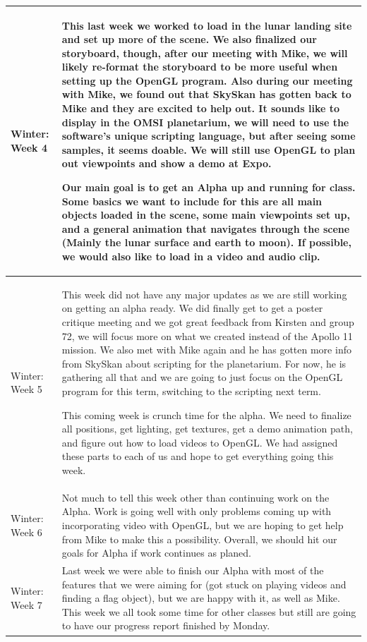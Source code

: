 \documentclass[onecolumn, draftclsnofoot,10pt, compsoc]{IEEEtran}
\begin{document}
\begin{longtable} {|p{1.5cm}|p{13.5cm}|}
Winter: Week 4 &This last week we worked to load in the lunar landing site and set up more of the scene. We also finalized our storyboard, though, after our meeting with Mike, we will likely re-format the storyboard to be more useful when setting up the OpenGL program. Also during our meeting with Mike, we found out that SkySkan has gotten back to Mike and they are excited to help out. It sounds like to display in the OMSI planetarium, we will need to use the software's unique scripting language, but after seeing some samples, it seems doable. We will still use OpenGL to plan out viewpoints and show a demo at Expo. 

Our main goal is to get an Alpha up and running for class. Some basics we want to include for this are all main objects loaded in the scene, some main viewpoints set up, and a general animation that navigates through the scene (Mainly the lunar surface and earth to moon). If possible, we would also like to load in a video and audio clip. 
\\ \hline

Winter: Week 5 & This week did not have any major updates as we are still working on getting an alpha ready. We did finally get to get a poster critique meeting and we got great feedback from Kirsten and group 72, we will focus more on what we created instead of the Apollo 11 mission. We also met with Mike again and he has gotten more info from SkySkan about scripting for the planetarium. For now, he is gathering all that and we are going to just focus on the OpenGL program for this term, switching to the scripting next term. 

This coming week is crunch time for the alpha. We need to finalize all positions, get lighting, get textures, get a demo animation path, and figure out how to load videos to OpenGL. We had assigned these parts to each of us and hope to get everything going this week. 
\\ \hline

Winter: Week 6 & 
Not much to tell this week other than continuing work on the Alpha. Work is going well with only problems coming up with incorporating video with OpenGL, but we are hoping to get help from Mike to make this a possibility. Overall, we should hit our goals for Alpha if work continues as planed. 
\\ \hline

Winter: Week 7 & 
Last week we were able to finish our Alpha with most of the features that we were aiming for (got stuck on playing videos and finding a flag object), but we are happy with it, as well as Mike. This week we all took some time for other classes but still are going to have our progress report finished by Monday. 


\end{longtable}
\end{document}
